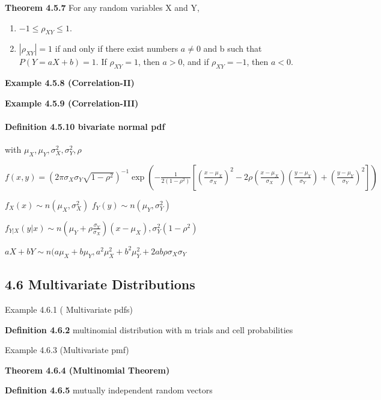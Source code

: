 \documentclass[6pt,twocolumn,Portrait]{article}
\providecommand{\tightlist}{%
  \setlength{\itemsep}{0pt}\setlength{\parskip}{0pt}}
\let\oldparagraph\paragraph
\renewcommand{\paragraph}[1]{\oldparagraph{#1}\mbox{}}
\begin{document}
\textbf{Theorem 4.5.7} For any random variables X and Y,

\begin{enumerate}
\def\labelenumi{\alph{enumi}.}
\tightlist
\item
  \(-1\le \rho_{XY}\le1\).
\item
  \(|\rho_{XY}|=1\) if and only if there exist numbers \(a\neq0\) and b
  such that \(P(Y=aX+b)=1\). If \(\rho_{XY}=1\), then \(a>0\), and if
  \(\rho_{XY}=-1\), then \(a<0\).
\end{enumerate}

\textbf{Example 4.5.8 (Correlation-II)}

\textbf{Example 4.5.9 (Correlation-III)}

\hypertarget{definition-4.5.10-bivariate-normal-pdf}{%
\paragraph{\texorpdfstring{\textbf{Definition 4.5.10} bivariate normal
pdf}{Definition 4.5.10 bivariate normal pdf}}\label{definition-4.5.10-bivariate-normal-pdf}}

with \(\mu_X,\mu_Y,\sigma_X^2,\sigma_Y^2, \rho\)

\(f(x,y)=(2\pi\sigma_X\sigma_Y\sqrt{1-\rho^2})^{-1}\exp(-\frac{1}{2(1-\rho^2)}[(\frac{x-\mu_X}{\sigma_X})^2-2\rho(\frac{x-\mu_X}{\sigma_X})(\frac{y-\mu_Y}{\sigma_Y})+(\frac{y-\mu_Y}{\sigma_Y})^2])\)

\(f_X(x)\sim n(\mu_X,\sigma^2_X)\) \(f_Y(y)\sim n(\mu_Y,\sigma^2_Y)\)

\(f_{Y|X}(y|x) \sim n(\mu_Y+\rho\frac{\sigma_Y}{\sigma_X})(x-\mu_X),\sigma_Y^2(1-\rho^2)\)

\(aX+bY\sim n(a\mu_X+b\mu_Y,a^2\mu_X^2+b^2\mu_Y^2+2ab\rho\sigma_X\sigma_Y\)

\hypertarget{multivariate-distributions}{%
\subsection{4.6 Multivariate
Distributions}\label{multivariate-distributions}}

Example 4.6.1 ( Multivariate pdfs)

\textbf{Definition 4.6.2} multinomial distribution with m trials and
cell probabilities

Example 4.6.3 (Multivariate pmf)

\textbf{Theorem 4.6.4 (Multinomial Theorem)}

\textbf{Definition 4.6.5} mutually independent random vectors
\end{document}
